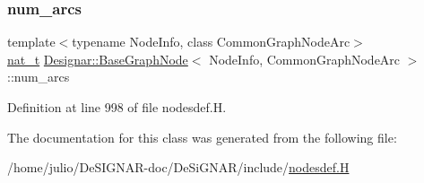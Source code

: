 \mbox{\label{class_designar_1_1_base_graph_node_a035347b8e1ffaca5df73b42bef300e0f}} 
\subsubsection{\texorpdfstring{num\+\_\+arcs}{num\_arcs}}
{\footnotesize\ttfamily template$<$typename Node\+Info, class Common\+Graph\+Node\+Arc$>$ \\
\hyperlink{namespace_designar_aa72662848b9f4815e7bf31a7cf3e33d1}{nat\+\_\+t} \hyperlink{class_designar_1_1_base_graph_node}{Designar\+::\+Base\+Graph\+Node}$<$ Node\+Info, Common\+Graph\+Node\+Arc $>$\+::num\+\_\+arcs\hspace{0.3cm}{\ttfamily [protected]}}



Definition at line 998 of file nodesdef.\+H.



The documentation for this class was generated from the following file\+:\begin{DoxyCompactItemize}
\item 
/home/julio/\+De\+S\+I\+G\+N\+A\+R-\/doc/\+De\+Si\+G\+N\+A\+R/include/\hyperlink{nodesdef_8_h}{nodesdef.\+H}\end{DoxyCompactItemize}
